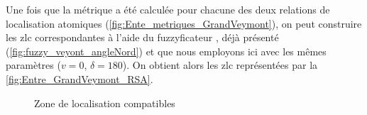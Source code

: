 Une fois que la métrique a été calculée pour chacune des deux
relations de localisation atomiques
(\autoref{fig:Ente_metriques_GrandVeymont}), on peut construire les
\ac{zlc} correspondantes à l'aide du fuzzyficateur
, déjà présenté
(\autoref{fig:fuzzy_veyont_angleNord}) et que nous employons ici avec
les mêmes paramètres (\(v = 0\), \(\delta=180\)). On obtient alors les
\ac{zlc} représentées par la \autoref{fig:Entre_GrandVeymont_RSA}.

\begin{figure}
  \centering
  \hspace{1cm}
  \caption{Zone de localisation compatibles}
  \label{fig:Entre_GrandVeymont_RSA}
\end{figure}

